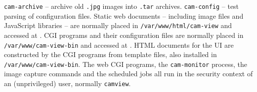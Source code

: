      \BI
     \I \texttt{cam-archive} -- archive old \texttt{.jpg} images into
        \texttt{.tar} archives.
     \I \texttt{cam-config} -- test parsing of configuration files.
     \EI
  \I Static web documents -- including image files and JavaScript
     libraries -- are normally placed in \texttt{/var/www/html/cam-view}
     and accessed at .
  \I CGI programs and their configuration files are normally placed in
     \texttt{/var/www/cam-view-bin} and accessed at
     .
  \I HTML documents for the UI are constructed by the CGI programs from
     template files, also installed in \texttt{/var/www/cam-view-bin}.
  \I The web CGI programs, the \texttt{cam-monitor} process, the
     image capture commands and the scheduled jobs all run in the
     security context of an (unprivileged) user, normally \texttt{camview}.
  \EE

